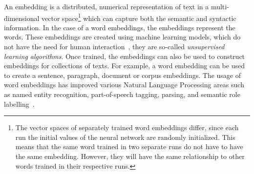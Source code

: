 \documentclass[../../Thesis.tex]{subfiles}
\begin{document}
An embedding is a distributed, numerical representation of text in a multi-dimensional vector space\footnote{The vector spaces of separately trained word embeddings differ, since each run the initial values of the neural network are randomly initialized. This means that the same word trained in two separate runs do not have to have the same embedding. However, they will have the same relationship to other words trained in their respective runs.} which can capture both the semantic and syntactic information\cite{mikolov2013distributed}. In the case of a word embeddings, the embeddings represent the words. These embeddings are created using machine learning models, which do not have the need for human interaction~\cite{lai2016generate}, they are so-called \textit{unsupervised learning algorithms}. Once trained, the embeddings can also be used to construct embeddings for collections of texts. For example, a word embedding can be used to create a sentence, paragraph, document or corpus embeddings. The usage of word embeddings has improved various Natural Language Processing areas such as named entity recognition, part-of-speech tagging, parsing, and semantic role labelling~\citet{luong2013better}.
\end{document}
